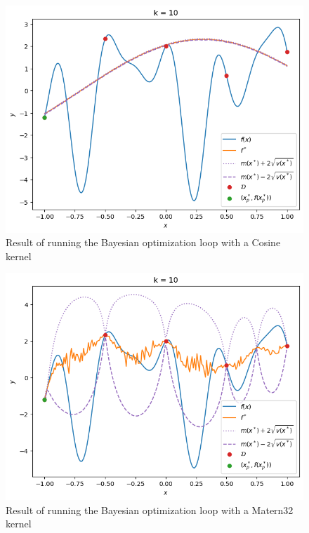 \begin{figure}[H]
    \includegraphics[width=\textwidth]{figures/gp/cosine.png}
    \caption{Result of running the Bayesian optimization loop with a Cosine kernel}
\end{figure}

\begin{figure}[H]
    \includegraphics[width=\textwidth]{figures/gp/mattern.png}
    \caption{Result of running the Bayesian optimization loop with a Matern32 kernel}
\end{figure}